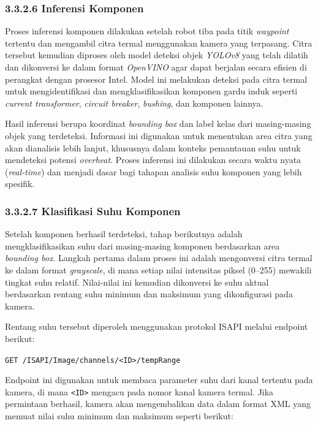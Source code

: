 \subsubsection{3.3.2.6 Inferensi Komponen}

Proses inferensi komponen dilakukan setelah robot tiba pada titik \emph{waypoint} tertentu dan mengambil citra termal menggunakan kamera yang terpasang. Citra tersebut kemudian diproses oleh model deteksi objek \emph{YOLOv8} yang telah dilatih dan dikonversi ke dalam format \emph{OpenVINO} agar dapat berjalan secara efisien di perangkat dengan prosesor Intel. Model ini melakukan deteksi pada citra termal untuk mengidentifikasi dan mengklasifikasikan komponen gardu induk seperti \emph{current transformer}, \emph{circuit breaker}, \emph{bushing}, dan komponen lainnya.

Hasil inferensi berupa koordinat \emph{bounding box} dan label kelas dari masing-masing objek yang terdeteksi. Informasi ini digunakan untuk menentukan area citra yang akan dianalisis lebih lanjut, khususnya dalam konteks pemantauan suhu untuk mendeteksi potensi \emph{overheat}. Proses inferensi ini dilakukan secara waktu nyata (\emph{real-time}) dan menjadi dasar bagi tahapan analisis suhu komponen yang lebih spesifik.

\subsubsection{3.3.2.7 Klasifikasi Suhu Komponen}

Setelah komponen berhasil terdeteksi, tahap berikutnya adalah mengklasifikasikan suhu dari masing-masing komponen berdasarkan area \emph{bounding box}. Langkah pertama dalam proses ini adalah mengonversi citra termal ke dalam format \emph{grayscale}, di mana setiap nilai intensitas piksel (0--255) mewakili tingkat suhu relatif. Nilai-nilai ini kemudian dikonversi ke suhu aktual berdasarkan rentang suhu minimum dan maksimum yang dikonfigurasi pada kamera.

Rentang suhu tersebut diperoleh menggunakan protokol ISAPI melalui endpoint berikut:

\begin{center}
\texttt{GET /ISAPI/Image/channels/<ID>/tempRange}
\end{center}

Endpoint ini digunakan untuk membaca parameter suhu dari kanal tertentu pada kamera, di mana \texttt{<ID>} mengacu pada nomor kanal kamera termal. Jika permintaan berhasil, kamera akan mengembalikan data dalam format XML yang memuat nilai suhu minimum dan maksimum seperti berikut:

